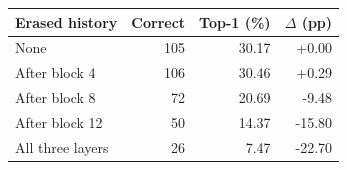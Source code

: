 \begin{tabular}{lrrr}
\hline
Erased history & Correct & Top-1 (\%) & $\Delta$ (pp) \\
\hline
None & 105 & 30.17 & +0.00 \\
After block 4 & 106 & 30.46 & +0.29 \\
After block 8 & 72 & 20.69 & -9.48 \\
After block 12 & 50 & 14.37 & -15.80 \\
All three layers & 26 & 7.47 & -22.70 \\
\hline
\end{tabular}
